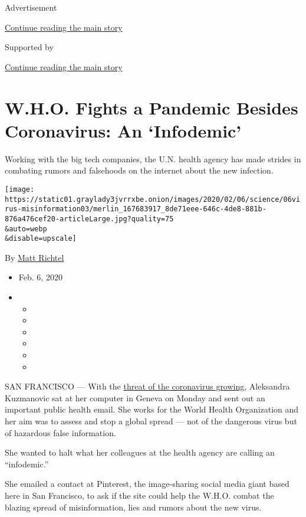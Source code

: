 Advertisement

\protect\hyperlink{after-top}{Continue reading the main story}

Supported by

\protect\hyperlink{after-sponsor}{Continue reading the main story}

\hypertarget{who-fights-a-pandemic-besides-coronavirus-an-infodemic}{%
\section{W.H.O. Fights a Pandemic Besides Coronavirus: An
`Infodemic'}\label{who-fights-a-pandemic-besides-coronavirus-an-infodemic}}

Working with the big tech companies, the U.N. health agency has made
strides in combating rumors and falsehoods on the internet about the new
infection.

\texttt{[image: https://static01.graylady3jvrrxbe.onion/images/2020/02/06/science/06virus-misinformation03/merlin\_167683917\_8de71eee-646c-4de8-881b-876a476cef20-articleLarge.jpg?quality=75\\\&auto=webp\\\&disable=upscale]}

By \href{https://www.nytimes3xbfgragh.onion/by/matt-richtel}{Matt
Richtel}

\begin{itemize}
\item
  Feb. 6, 2020
\item
  \begin{itemize}
  \item
  \item
  \item
  \item
  \item
  \item
  \end{itemize}
\end{itemize}

SAN FRANCISCO --- With the
\href{https://www.nytimes3xbfgragh.onion/2020/02/02/health/coronavirus-pandemic-china.html}{threat
of the coronavirus growing}, Aleksandra Kuzmanovic sat at her computer
in Geneva on Monday and sent out an important public health email. She
works for the World Health Organization and her aim was to assess and
stop a global spread --- not of the dangerous virus but of hazardous
false information.

She wanted to halt what her colleagues at the health agency are calling
an ``infodemic.''

She emailed a contact at Pinterest, the image-sharing social media giant
based here in San Francisco, to ask if the site could help the W.H.O.
combat the blazing spread of misinformation, lies and rumors about the
new virus.

